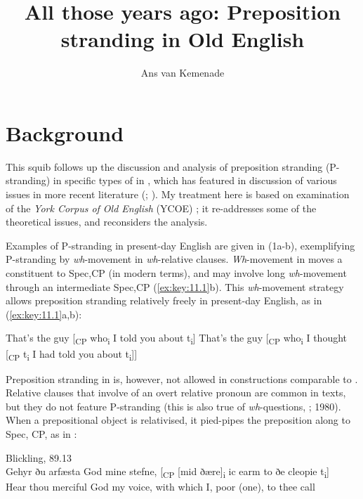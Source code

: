 \documentclass[output=paper]{langsci/langscibook}
\author{Ans van Kemenade\affiliation{Radboud University}}
\title{All those years ago: Preposition stranding in Old English}
\begin{document}
\glsresetall

\section{Background}

This squib follows up the discussion and analysis of preposition stranding
(P-stranding)  in specific types of   in
\citet{vanKemenade1987}, which has featured in discussion of various issues in
more recent literature (\citealt{Alcorn2014}; \citealt{EmoFaa2014}).  My
treatment here is based on examination of the \textit{York Corpus of Old
English} (\gls{YCOE}) \parencite{Tayloretal2003}; it
re-addresses some of the theoretical issues, and reconsiders the analysis.

Examples of P-stranding in present-day English are
given in (1a-b), exemplifying P-stranding by
\textit{wh}-movement in \textit{wh}-relative clauses. \textit{Wh}-movement in
 moves a constituent to Spec,CP (in modern terms), and
may involve long \textit{wh}-movement through an intermediate Spec,CP
(\ref{ex:key:11.1}b). This \textit{wh}-movement strategy allows preposition
stranding relatively freely in present-day English, as in
(\ref{ex:key:11.1}a,b):

\ea%
    \label{ex:key:11.1}
	\ea That’s the guy [\textsubscript{CP} who\textsubscript{i} I told you about t\textsubscript{i}]
	\ex That’s the guy [\textsubscript{CP} who\textsubscript{i} I thought [\textsubscript{CP} t\textsubscript{i} I had told you about t\textsubscript{i}]]
	\z
\z

Preposition stranding in  is, however, not allowed in constructions
comparable to . Relative clauses that involve  of an
overt relative pronoun are common in  texts, but they do not feature
P-stranding (this is also true of \textit{wh}-questions, \citealt{Allen1977};
1980). When a prepositional object is relativised, it pied-pipes the
preposition along to Spec, CP, as in :

\ea Blickling, 89.13 \parencite[270]{Allen1980}\label{ex:key:11.2}\\
    \gll Gehyr ðu arfæsta God mine stefne, [\textsubscript{CP} [mid ðære]\textsubscript{i}   ic earm {}  to ðe cleopie  t\textsubscript{i}]\\
    Hear thou merciful God my voice, {} with \hphantom{[}which I, poor (one), to thee call\\
\z
\end{document}
